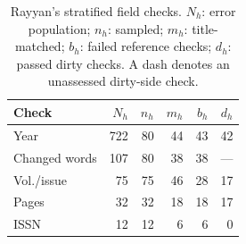 \begin{table}[t]
  \caption{Rayyan's stratified field checks. $N_h$: error population; $n_h$: sampled;
  $m_h$: title-matched; $b_h$: failed reference checks; $d_h$: passed dirty checks.
  A dash denotes an unassessed dirty-side check.}
  \label{tab:rayyan}
  \small
  \begin{tabular*}{\columnwidth}{@{\extracolsep{\fill}}lrrrrr@{}}
    \toprule
    Check & $N_h$ & $n_h$ & $m_h$ & $b_h$ & $d_h$ \\
    \midrule
    Year & 722 & 80 & 44 & 43 & 42 \\
    Changed words & 107 & 80 & 38 & 38 & --- \\
    Vol./issue & 75 & 75 & 46 & 28 & 17 \\
    Pages & 32 & 32 & 18 & 18 & 17 \\
    ISSN & 12 & 12 & 6 & 6 & 0 \\
    \bottomrule
  \end{tabular*}
\end{table}
